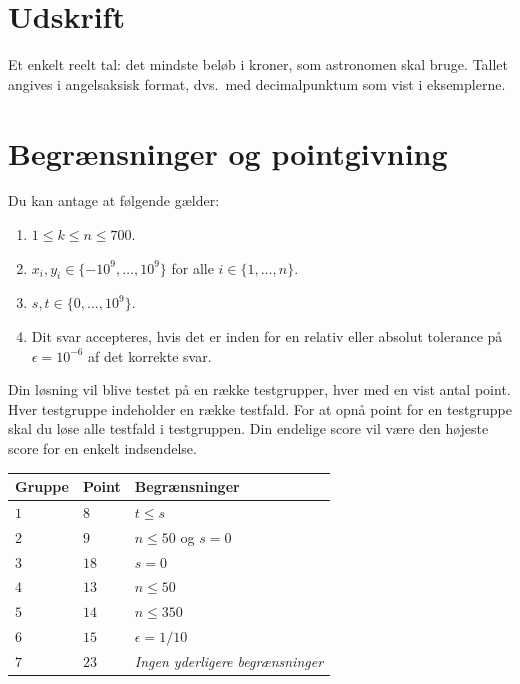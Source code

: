 \section*{Udskrift}

Et enkelt reelt tal: det mindste beløb i kroner, som astronomen skal bruge.
Tallet angives i angelsaksisk format, dvs.\ med decimalpunktum som vist i eksemplerne.

\section*{Begrænsninger og pointgivning}

Du kan antage at følgende gælder:
\begin{enumerate}
\item $1\leq k\leq n\leq 700$. %
\item $x_i, y_i\in \{-10^9,\ldots, 10^9\}$ for alle $i\in\{1,\ldots,n\}$. %
\item $s,t\in \{0,\ldots, 10^9\}$. %
\item Dit svar accepteres, hvis det er inden for en relativ eller absolut tolerance på $\epsilon = 10^{-6}$ af det korrekte svar.
\end{enumerate}

Din løsning vil blive testet på en række testgrupper, hver med en vist antal point.
Hver testgruppe indeholder en række testfald.
For at opnå point for en testgruppe skal du løse alle testfald i testgruppen.
Din endelige score vil være den højeste score for en enkelt indsendelse.

\medskip
\noindent
\begin{tabular}{lll}
Gruppe & Point & Begrænsninger\\\hline
$1$ & $8$ & $t\leq s$\\
$2$ & $9$ & $n\leq 50$ og $s=0$\\
$3$ & $18$ & $s=0$\\
$4$ & $13$ & $n\leq 50$\\
$5$ & $14$ & $n\leq 350$\\
$6$ & $15$ & $\epsilon = 1/10$\\
$7$ & $23$ & \emph{Ingen yderligere begrænsninger}
\end{tabular}
